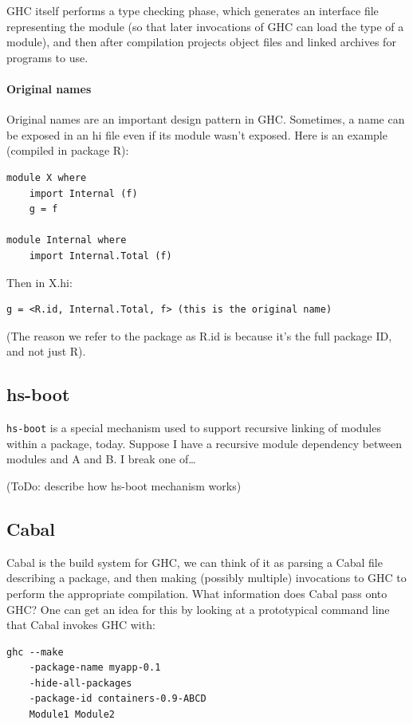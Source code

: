 \documentclass{article}
\begin{document}
GHC itself performs a type checking phase, which generates an interface
file representing the module (so that later invocations of GHC can load the type
of a module), and then after compilation projects object files and linked archives
for programs to use.

\paragraph{Original names} Original names are an important design pattern
in GHC\@.
Sometimes, a name can be exposed in an hi file even if its module
wasn't exposed. Here is an example (compiled in package R):

\begin{verbatim}
module X where
    import Internal (f)
    g = f

module Internal where
    import Internal.Total (f)
\end{verbatim}

Then in X.hi:

\begin{verbatim}
g = <R.id, Internal.Total, f> (this is the original name)
\end{verbatim}

(The reason we refer to the package as R.id is because it's the
full package ID, and not just R).

\subsection{hs-boot}

\verb|hs-boot| is a special mechanism used to support recursive linking
of modules within a package, today.  Suppose I have a recursive module
dependency between modules and A and B. I break one of\ldots

(ToDo: describe how hs-boot mechanism works)

\subsection{Cabal}

Cabal is the build system for GHC, we can think of it as parsing a Cabal
file describing a package, and then making (possibly multiple)
invocations to GHC to perform the appropriate compilation.  What
information does Cabal pass onto GHC\@?  One can get an idea for this by
looking at a prototypical command line that Cabal invokes GHC with:

\begin{verbatim}
ghc --make
    -package-name myapp-0.1
    -hide-all-packages
    -package-id containers-0.9-ABCD
    Module1 Module2
\end{verbatim}
\end{document}
